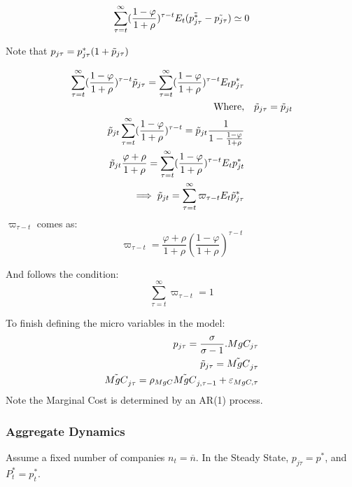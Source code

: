 \begin{equation}
    \sum^{\infty}_{\tau=t}(\frac{1-\varphi}{1+\rho})^{\tau-t}E_{t}(\Tilde{p_{j\tau}^{*}}-\Tilde{p_{j\tau}})\simeq 0 
\end{equation}

Note that $p_{j\tau}=p_{j\tau}^{*}(1+\Tilde{p}_{j\tau})$

\begin{equation*}
   \begin{aligned}
    \sum^{\infty}_{\tau=t}(\frac{1-\varphi}{1+\rho})^{\tau-t}\Tilde{p}_{j\tau}=\sum^{\infty}_{\tau=t}(\frac{1-\varphi}{1+\rho})^{\tau-t}E_{t}p_{j\tau}^{*} \\ \text{Where,} && \Tilde{p}_{j\tau}=\Tilde{p}_{jt} \\
    \Tilde{p}_{jt}\sum^{\infty}_{\tau=t}(\frac{1-\varphi}{1+\rho})^{\tau-t}=\Tilde{p}_{jt}\frac{1}{1-\frac{1-\varphi}{1+\rho}} \\
    \Tilde{p}_{jt}\frac{\varphi+\rho}{1+\rho}=\sum^{\infty}_{\tau=t}(\frac{1-\varphi}{1+\rho})^{\tau-t}E_{t}p_{jt}^{*} \\ 
   \implies \Tilde{p}_{jt}=\sum^{\infty}_{\tau=t}\varpi_{\tau-t}E_{t}\Tilde{p}_{j\tau}^{*}
   \end{aligned}
\end{equation*}
$\varpi_{\tau-t}$ comes as:
\begin{equation*}
       \varpi_{\tau-t}=\frac{\varphi+\rho}{1+\rho}(\frac{1-\varphi}{1+\rho})^{\tau-t} 
\end{equation*}

And follows the condition:
\begin{equation*}
        \sum^{\infty}_{\tau=t}\varpi_{\tau-t}=1
\end{equation*}

To finish defining the micro variables in the model: 
\begin{equation*}
    \begin{aligned}
        p_{j\tau}=\frac{\sigma}{\sigma-1}.MgC_{j\tau} \\
        \Tilde{p}_{j\tau}=\Tilde{MgC}_{j\tau} \\
        \Tilde{MgC}_{j\tau}=\rho_{MgC}\Tilde{MgC}_{j,\tau-1}+\varepsilon_{MgC,\tau}
    \end{aligned}
\end{equation*}
Note the Marginal Cost is determined by an AR(1) process.

\subsubsection{Aggregate Dynamics}
Assume a fixed number of companies $n_{t}=\overline{n}$.
In the Steady State, $p_{j\tau}=p^{*}$, and $P_{t}^{*}=p_{t}^{*}$.

